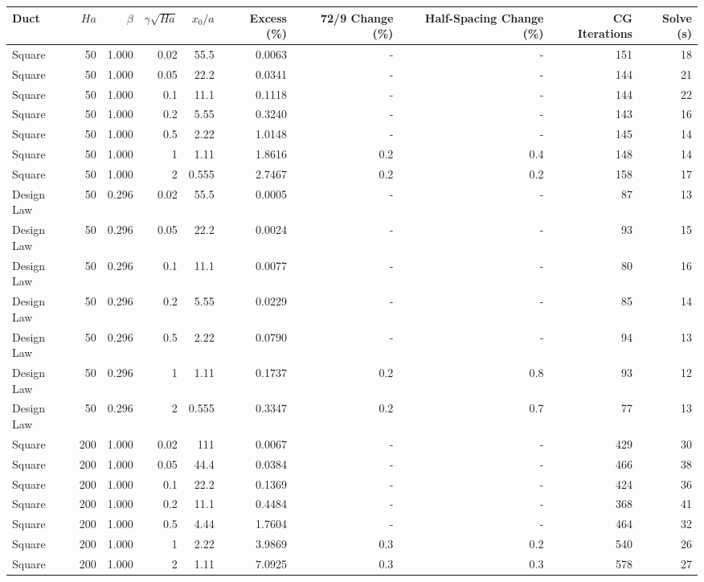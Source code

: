 \begin{tabular}{lrrrrrrrrr}
\toprule
Duct & $Ha$ & $\beta$ & $\gamma\sqrt{Ha}$ & $x_0/a$ & Excess (\%) & 72/9 Change (\%) & Half-Spacing Change (\%) & CG Iterations & Solve (s) \\
\midrule
Square & 50 & 1.000 & 0.02 & 55.5 & 0.0063 & - & - & 151 & 18 \\
Square & 50 & 1.000 & 0.05 & 22.2 & 0.0341 & - & - & 144 & 21 \\
Square & 50 & 1.000 & 0.1 & 11.1 & 0.1118 & - & - & 144 & 22 \\
Square & 50 & 1.000 & 0.2 & 5.55 & 0.3240 & - & - & 143 & 16 \\
Square & 50 & 1.000 & 0.5 & 2.22 & 1.0148 & - & - & 145 & 14 \\
Square & 50 & 1.000 & 1 & 1.11 & 1.8616 & 0.2 & 0.4 & 148 & 14 \\
Square & 50 & 1.000 & 2 & 0.555 & 2.7467 & 0.2 & 0.2 & 158 & 17 \\
Design Law & 50 & 0.296 & 0.02 & 55.5 & 0.0005 & - & - & 87 & 13 \\
Design Law & 50 & 0.296 & 0.05 & 22.2 & 0.0024 & - & - & 93 & 15 \\
Design Law & 50 & 0.296 & 0.1 & 11.1 & 0.0077 & - & - & 80 & 16 \\
Design Law & 50 & 0.296 & 0.2 & 5.55 & 0.0229 & - & - & 85 & 14 \\
Design Law & 50 & 0.296 & 0.5 & 2.22 & 0.0790 & - & - & 94 & 13 \\
Design Law & 50 & 0.296 & 1 & 1.11 & 0.1737 & 0.2 & 0.8 & 93 & 12 \\
Design Law & 50 & 0.296 & 2 & 0.555 & 0.3347 & 0.2 & 0.7 & 77 & 13 \\
Square & 200 & 1.000 & 0.02 & 111 & 0.0067 & - & - & 429 & 30 \\
Square & 200 & 1.000 & 0.05 & 44.4 & 0.0384 & - & - & 466 & 38 \\
Square & 200 & 1.000 & 0.1 & 22.2 & 0.1369 & - & - & 424 & 36 \\
Square & 200 & 1.000 & 0.2 & 11.1 & 0.4484 & - & - & 368 & 41 \\
Square & 200 & 1.000 & 0.5 & 4.44 & 1.7604 & - & - & 464 & 32 \\
Square & 200 & 1.000 & 1 & 2.22 & 3.9869 & 0.3 & 0.2 & 540 & 26 \\
Square & 200 & 1.000 & 2 & 1.11 & 7.0925 & 0.3 & 0.3 & 578 & 27 \\

\end{tabular}
